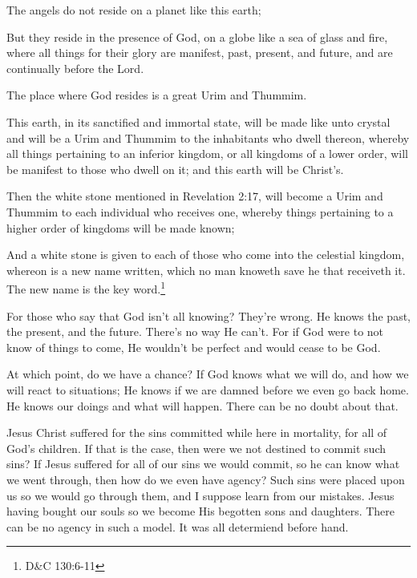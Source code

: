 \begin{displayquote}
The angels do not reside on a planet like this earth;

But they reside in the presence of God, on a globe like a sea of glass and fire, 
where all things for their glory are manifest, past, present, and future, and are 
continually before the Lord.

The place where God resides is a great Urim and Thummim.

This earth, in its sanctified and immortal state, will be made like unto crystal and 
will be a Urim and Thummim to the inhabitants who dwell thereon, whereby all things 
pertaining to an inferior kingdom, or all kingdoms of a lower order, will be manifest 
to those who dwell on it; and this earth will be Christ's.

Then the white stone mentioned in Revelation 2:17, will become a Urim and Thummim to 
each individual who receives one, whereby things pertaining to a higher order of 
kingdoms will be made known;

And a white stone is given to each of those who come into the celestial kingdom, 
whereon is a new name written, which no man knoweth save he that receiveth it. The 
new name is the key word.\footnote{D\&C 130:6-11}
\end{displayquote}

For those who say that God isn't all knowing? They're wrong. He knows the past, the
present, and the future. There's no way He can't. For if God were to not know of
things to come, He wouldn't be perfect and would cease to be God.

At which point, do we have a chance? If God knows what we will do, and how we will
react to situations; He knows if we are damned before we even go back home. He knows
our doings and what will happen. There can be no doubt about that.

Jesus Christ suffered for the sins committed while here in  mortality, for all of
God's children. If that is the case, then were we not destined to commit such sins?
If Jesus suffered for all of our sins we would commit, so he can know what we went
through, then how do we even have agency? Such sins were placed upon us so we would
go through them, and I suppose learn from our mistakes. Jesus having bought our souls
so we become His begotten sons and daughters. There can be no agency in such a model.
It was all determiend before hand.
